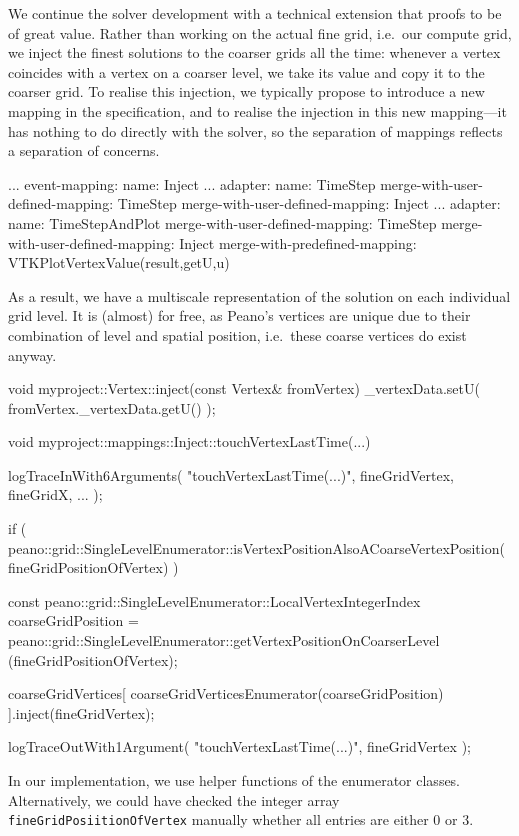 We continue the solver development with a technical extension that proofs to be
of great value.
Rather than working on the actual fine grid, i.e.~our compute grid, we inject
the finest solutions to the coarser grids all the time:
whenever a vertex coincides with a vertex on a coarser level, we take its value
and copy it to the coarser grid.
To realise this injection, we typically propose to introduce a new mapping in
the specification, and to realise the injection in this new mapping---it has
nothing to do directly with the solver, so the separation of mappings reflects a
separation of concerns.

\begin{code}
...
event-mapping:
  name: Inject
...
adapter:
  name: TimeStep
  merge-with-user-defined-mapping: TimeStep
  merge-with-user-defined-mapping: Inject
...
adapter:
  name: TimeStepAndPlot
  merge-with-user-defined-mapping: TimeStep
  merge-with-user-defined-mapping: Inject
  merge-with-predefined-mapping: VTKPlotVertexValue(result,getU,u)
\end{code}


\noindent
As a result, we have a multiscale representation of the solution on each
individual grid level.
It is (almost) for free, as Peano's vertices are unique due to their combination
of level and spatial position, i.e.~these coarse vertices do exist anyway.

\begin{code}
void myproject::Vertex::inject(const Vertex& fromVertex) {
  _vertexData.setU( fromVertex._vertexData.getU() );
}

void myproject::mappings::Inject::touchVertexLastTime(...) {
 logTraceInWith6Arguments( "touchVertexLastTime(...)", fineGridVertex, fineGridX, ... );

 if ( peano::grid::SingleLevelEnumerator::isVertexPositionAlsoACoarseVertexPosition(
  fineGridPositionOfVertex) ) {
  const peano::grid::SingleLevelEnumerator::LocalVertexIntegerIndex coarseGridPosition = 
   peano::grid::SingleLevelEnumerator::getVertexPositionOnCoarserLevel
   (fineGridPositionOfVertex);

  coarseGridVertices[ coarseGridVerticesEnumerator(coarseGridPosition) ].inject(fineGridVertex);
 }

 logTraceOutWith1Argument( "touchVertexLastTime(...)", fineGridVertex );
}
\end{code}

\noindent
In our implementation, we use helper functions of the enumerator classes. 
Alternatively, we could have checked the integer array
\texttt{fineGridPosiitionOfVertex} manually whether all entries are either 0 or
3.


